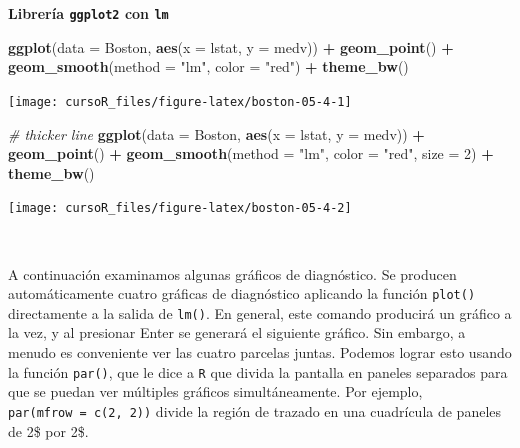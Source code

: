\documentclass[]{book}
\newenvironment{Shaded}{\begin{snugshade}}{\end{snugshade}}
\newcommand{\KeywordTok}[1]{\textcolor[rgb]{0.13,0.29,0.53}{\textbf{#1}}}
\newcommand{\DataTypeTok}[1]{\textcolor[rgb]{0.13,0.29,0.53}{#1}}
\newcommand{\DecValTok}[1]{\textcolor[rgb]{0.00,0.00,0.81}{#1}}
\newcommand{\StringTok}[1]{\textcolor[rgb]{0.31,0.60,0.02}{#1}}
\newcommand{\CommentTok}[1]{\textcolor[rgb]{0.56,0.35,0.01}{\textit{#1}}}
\newcommand{\OperatorTok}[1]{\textcolor[rgb]{0.81,0.36,0.00}{\textbf{#1}}}
\newcommand{\NormalTok}[1]{#1}
\begin{document}
\textbf{Librería \texttt{ggplot2} con \texttt{lm}}

\begin{Shaded}
\begin{Highlighting}[]
\KeywordTok{ggplot}\NormalTok{(}\DataTypeTok{data =}\NormalTok{ Boston, }\KeywordTok{aes}\NormalTok{(}\DataTypeTok{x =}\NormalTok{ lstat, }\DataTypeTok{y =}\NormalTok{ medv)) }\OperatorTok{+}
\StringTok{  }\KeywordTok{geom_point}\NormalTok{() }\OperatorTok{+}
\StringTok{  }\KeywordTok{geom_smooth}\NormalTok{(}\DataTypeTok{method =} \StringTok{"lm"}\NormalTok{, }\DataTypeTok{color =} \StringTok{"red"}\NormalTok{) }\OperatorTok{+}
\StringTok{  }\KeywordTok{theme_bw}\NormalTok{()}
\end{Highlighting}
\end{Shaded}

\begin{center}\texttt{[image: cursoR\_files/figure-latex/boston-05-4-1]} \end{center}

\begin{Shaded}
\begin{Highlighting}[]
\CommentTok{# thicker line}
\KeywordTok{ggplot}\NormalTok{(}\DataTypeTok{data =}\NormalTok{ Boston, }\KeywordTok{aes}\NormalTok{(}\DataTypeTok{x =}\NormalTok{ lstat, }\DataTypeTok{y =}\NormalTok{ medv)) }\OperatorTok{+}
\StringTok{  }\KeywordTok{geom_point}\NormalTok{() }\OperatorTok{+}
\StringTok{  }\KeywordTok{geom_smooth}\NormalTok{(}\DataTypeTok{method =} \StringTok{"lm"}\NormalTok{, }\DataTypeTok{color =} \StringTok{"red"}\NormalTok{, }\DataTypeTok{size =} \DecValTok{2}\NormalTok{) }\OperatorTok{+}
\StringTok{  }\KeywordTok{theme_bw}\NormalTok{()}
\end{Highlighting}
\end{Shaded}

\begin{center}\texttt{[image: cursoR\_files/figure-latex/boston-05-4-2]} \end{center}

~

A continuación examinamos algunas gráficos de diagnóstico. Se producen
automáticamente cuatro gráficas de diagnóstico aplicando la función
\texttt{plot()} directamente a la salida de \texttt{lm()}. En general,
este comando producirá un gráfico a la vez, y al presionar Enter se
generará el siguiente gráfico. Sin embargo, a menudo es conveniente ver
las cuatro parcelas juntas. Podemos lograr esto usando la función
\texttt{par()}, que le dice a \texttt{R} que divida la pantalla en
paneles separados para que se puedan ver múltiples gráficos
simultáneamente. Por ejemplo, \texttt{par(mfrow\ =\ c(2,\ 2))} divide la
región de trazado en una cuadrícula de paneles de 2\$ por 2\$.
\end{document}
